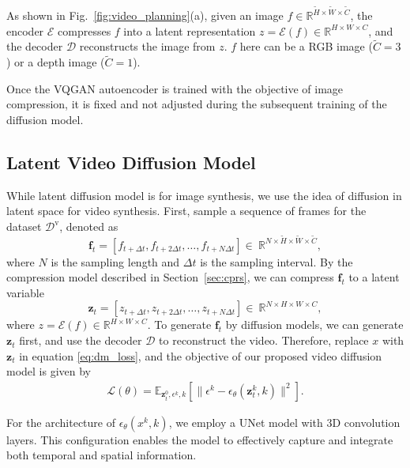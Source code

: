 \documentclass[doublecolumn]{IEEEtran}
\begin{document}
As shown in Fig.~\ref{fig:video_planning}(a), given an image $f \in \mathbb{R}^{\tilde{H} \times \tilde{W}\times \tilde{C}}$, the encoder $\mathcal{E}$ compresses $f$ into a latent representation $z = \mathcal{E}(f) \in \mathbb{R}^{H \times W \times C}$, and the decoder $\mathcal{D}$ reconstructs the image from $z$. $f$ here can be a RGB image ($\tilde{C}=3$) or a depth image ($\tilde{C}=1$).

{Once the VQGAN autoencoder is trained with the objective of image compression, it is fixed and not adjusted during the subsequent training of the diffusion model. }


\subsection{Latent Video Diffusion Model}


While latent diffusion model \cite{rombach2022high} is for image synthesis, we use the idea of diffusion in latent space for video synthesis. First, sample a sequence of frames for the dataset $\mathcal{D}^{\text{v}}$, denoted as 
$$\mathbf{f}_t = [f_{t+\Delta t},f_{t+2\Delta t},\ldots,f_{t+N\Delta t}]\in \ \mathbb{R}^{N \times \tilde{H} \times \tilde{W} \times \tilde{C}},$$ 
where $N$ is the sampling length and $\Delta t$ is the sampling interval. By the compression model described in Section~\ref{sec:cprs}, we can compress $\mathbf{f}_t$ to a latent variable
$$\mathbf{z}_t = [z_{t+\Delta t},z_{t+2\Delta t},\ldots,z_{t+N\Delta t}]\in \ \mathbb{R}^{N \times H \times W \times C},$$
where $z = \mathcal{E}(f) \in \mathbb{R}^{H \times W \times C}$. To generate $\mathbf{f}_t$ by diffusion models, we can generate $\mathbf{z}_t$ first, and use the decoder $\mathcal{D}$ to reconstruct the video. Therefore, replace $x$ with $\mathbf{z}_t$ in equation \eqref{eq:dm_loss}, and the objective of our proposed video diffusion model is given by
\begin{align}
    \mathcal{L}(\theta) = \mathbb{E}_{\mathbf{z}^0_t, \epsilon^k, k}\left[ \| \epsilon^k - \epsilon_\theta(\mathbf{z}^k_t, k) \|^2 \right].
    \label{eq:video_loss}
\end{align}

For the architecture of $\epsilon_\theta(x^k, k)$, we employ a UNet model \cite{dhariwal2021diffusion,ronneberger2015u} with 3D convolution layers. This configuration enables the model to effectively capture and integrate both temporal and spatial information. 
\end{document}
